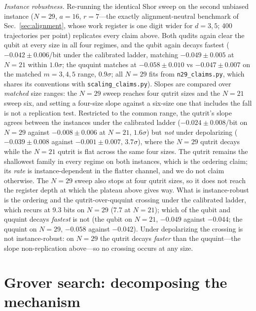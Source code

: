 \documentclass[aps,pra,reprint,superscriptaddress,nofootinbib,floatfix]{revtex4-2}
\begin{document}
\emph{Instance robustness.} Re-running the identical Shor sweep on the
second unbiased instance ($N=29$, $a=16$, $r=7$---the exactly
alignment-neutral benchmark of Sec.~\ref{sec:alignment}, whose work
register is one digit wider for $d=3,5$; 400 trajectories per point)
replicates every claim above. Both qudits again clear the
qubit at every size in all four regimes, and the qubit again decays
fastest ($-0.042\pm0.006$/bit under the calibrated ladder, matching
$-0.049\pm0.005$ at $N=21$ within $1.0\sigma$; the ququint matches at
$-0.058\pm0.010$ vs $-0.047\pm0.007$ on the matched $m=3,4,5$ range,
$0.9\sigma$; all $N=29$ fits from
\texttt{n29\_claims.py}, which shares its conventions with
\texttt{scaling\_claims.py}). Slopes are
compared over \emph{matched} size ranges: the $N=29$ sweep reaches
four qutrit sizes and the $N=21$ sweep six, and setting a four-size
slope against a six-size one that includes the fall is not a
replication test. Restricted to the common range, the qutrit's slope
agrees between the instances under the calibrated ladder
($-0.024\pm0.008$/bit on $N=29$ against $-0.008\pm0.006$ at $N=21$,
$1.6\sigma$) but \emph{not} under depolarizing
($-0.039\pm0.008$ against $-0.001\pm0.007$, $3.7\sigma$), where the
$N=29$ qutrit decays while the $N=21$ qutrit is flat across the same
four sizes. The qutrit remains the shallowest family in every regime
on both instances, which is the ordering claim; its \emph{rate} is
instance-dependent in the flatter channel, and we do not claim
otherwise. The $N=29$ sweep also stops at four qutrit sizes, so it
does not reach the register depth at which the plateau above gives
way. What is instance-robust is the ordering
and the qutrit-over-ququint crossing under the calibrated ladder,
which recurs at 9.3 bits on $N=29$ (7.7 at $N=21$); which of the
qubit and ququint decays \emph{fastest} is not (the qubit on
$N=21$, $-0.049$ against $-0.044$; the ququint on $N=29$, $-0.058$
against $-0.042$). Under
depolarizing the crossing is not instance-robust: on $N=29$ the
qutrit decays \emph{faster} than the ququint---the slope
non-replication above---so no crossing occurs at any size.

\section{Grover search: decomposing the mechanism}
\label{sec:grover}
\end{document}
